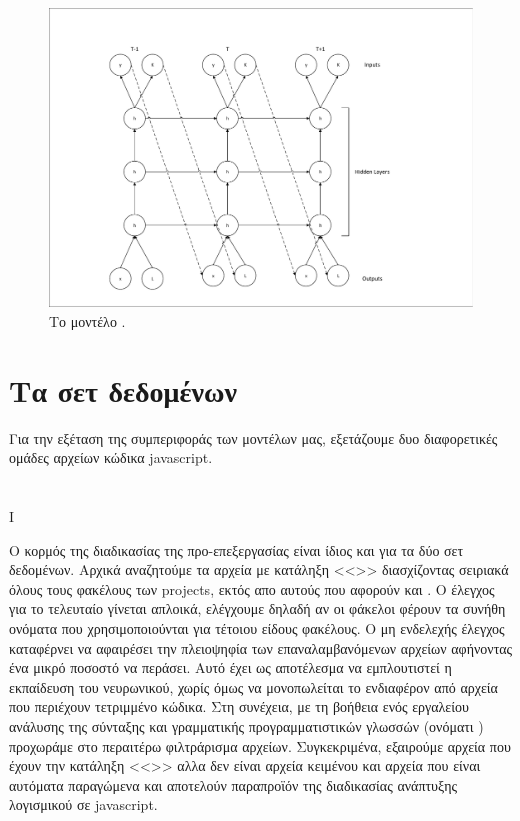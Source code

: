 \begin{figure}[h]
	\includegraphics[width=\textwidth, trim = 4 4 4 4, clip, keepaspectratio]{images/l-char-rnn.pdf}
	\centering 
	\caption{Το μοντέλο .}
	\label{fig:l-char-rnn}
\end{figure}

\section{Τα σετ δεδομένων}

Για την εξέταση της συμπεριφοράς των μοντέλων μας, εξετάζουμε δυο διαφορετικές ομάδες αρχείων κώδικα javascript. %

\section{}I

Ο κορμός της διαδικασίας της προ-επεξεργασίας είναι ίδιος και για τα δύο σετ δεδομένων. 
Αρχικά αναζητούμε τα αρχεία με κατάληξη <<>> διασχίζοντας σειριακά όλους τους φακέλους των projects, εκτός απο αυτούς που αφορούν  και .
Ο έλεγχος για το τελευταίο γίνεται απλοικά, ελέγχουμε δηλαδή αν οι φάκελοι φέρουν τα συνήθη ονόματα που χρησιμοποιούνται για τέτοιου είδους φακέλους.
Ο μη ενδελεχής έλεγχος καταφέρνει να αφαιρέσει την πλειοψηφία των επαναλαμβανόμενων αρχείων αφήνοντας ένα μικρό ποσοστό να περάσει.
Αυτό έχει ως αποτέλεσμα να εμπλουτιστεί η εκπαίδευση του νευρωνικού, χωρίς όμως να μονοπωλείται το ενδιαφέρον από αρχεία που περιέχουν τετριμμένο κώδικα.
Στη συνέχεια, με τη βοήθεια ενός εργαλείου ανάλυσης της σύνταξης και γραμματικής προγραμματιστικών γλωσσών (ονόματι ) προχωράμε στο περαιτέρω φιλτράρισμα αρχείων.
Συγκεκριμένα, εξαιρούμε αρχεία που έχουν την κατάληξη <<>> αλλα δεν είναι αρχεία κειμένου και αρχεία που είναι αυτόματα παραγώμενα και αποτελούν παραπροϊόν της διαδικασίας ανάπτυξης λογισμικού σε javascript.

